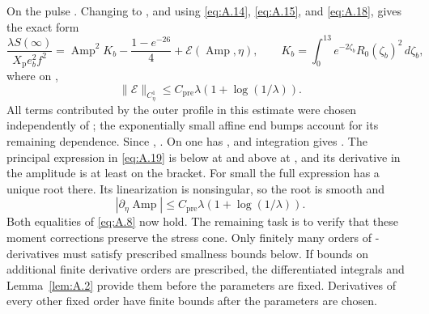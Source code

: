 %
On the pulse . Changing to
, and using \eqref{eq:A.14}, \eqref{eq:A.15}, and
\eqref{eq:A.18}, gives the exact form
\begin{equation}
 \frac{\lambda S(\infty)}{X_{\mathrm p} e_b^2 f^2}
 =\operatorname{Amp}^2K_b-\frac{1-e^{-26}}{4}+\mathcal E(\operatorname{Amp},\eta),
 \qquad
 K_b=\int_0^{13}e^{-2\zeta_b}R_0(\zeta_b)^2\,d\zeta_b,
 \tag{A.19}\label{eq:A.19}
\end{equation}
where on ,
\[
 \lVert\mathcal E\rVert_{C^1_\eta}
 \leq C_{\mathrm{pre}}\lambda(1+\log(1/\lambda)).
\]
All terms contributed by the outer profile  in this estimate were
chosen independently of ; the exponentially small affine
end bumps account for its remaining dependence. Since
,
. On
 one has
, and integration gives
. The principal expression in \eqref{eq:A.19} is below
 at  and above
 at , and its derivative in the
amplitude is at least  on the bracket. For small
 the full expression has a unique root there. Its linearization
is nonsingular, so the root is smooth and
\begin{equation}
 |\partial_\eta\operatorname{Amp}|
 \leq C_{\mathrm{pre}}\lambda(1+\log(1/\lambda)).
 \tag{A.20}\label{eq:A.20}
\end{equation}
Both equalities of \eqref{eq:A.8} now hold. The remaining task is to verify that these moment
corrections preserve the stress cone. Only finitely many orders of
-derivatives must satisfy prescribed smallness bounds below. If
bounds on additional finite derivative orders are prescribed, the differentiated integrals and
Lemma~\ref{lem:A.2} provide them before the parameters are fixed. Derivatives of every other
fixed order have finite bounds after the parameters are chosen.

